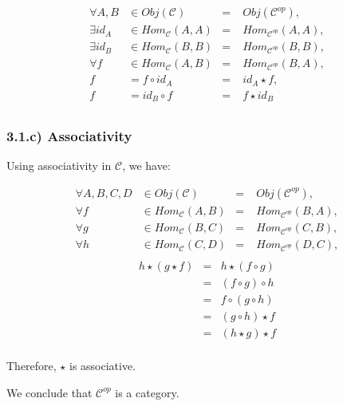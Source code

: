 $$
\begin{aligned}
	\forall A, B & \in Obj (\mathcal{C})        &=& \;  Obj (\mathcal{C}^{op})        , \\
	\exists id_A & \in Hom_{\mathcal{C}} (A, A) &=& \;  Hom_{\mathcal{C}^{op}} (A, A) , \\
	\exists id_B & \in Hom_{\mathcal{C}} (B, B) &=& \;  Hom_{\mathcal{C}^{op}} (B, B) , \\
	\forall f    & \in Hom_{\mathcal{C}} (A, B) &=& \;  Hom_{\mathcal{C}^{op}} (B, A) , \\
	f            & =   f    \circ id_A          &=& \;  id_A \star f                  , \\
	f            & =   id_B \circ    f          &=& \;  f    \star id_B                 \\
\end{aligned}
$$

\subsubsection*{3.1.c) Associativity}

Using associativity in $\mathcal{C}$, we have:

$$
\begin{aligned}
	\forall A, B, C, D & \in Obj (\mathcal{C})        &=& \;  Obj (\mathcal{C}^{op})        , \\
	\forall f          & \in Hom_{\mathcal{C}} (A, B) &=& \;  Hom_{\mathcal{C}^{op}} (B, A) , \\
	\forall g          & \in Hom_{\mathcal{C}} (B, C) &=& \;  Hom_{\mathcal{C}^{op}} (C, B) , \\
	\forall h          & \in Hom_{\mathcal{C}} (C, D) &=& \;  Hom_{\mathcal{C}^{op}} (D, C) , \\
\end{aligned}
$$
$$
\begin{aligned}
	h \star (g \star f) &=&  h \star (f  \circ g) \\
						&=& (f \circ  g) \circ h  \\
						&=&  f \circ  (g \circ h) \\
						&=&  (g \circ h) \star f  \\
						&=&  (h \star g) \star f  \\
\end{aligned}
$$

Therefore, $\star$ is associative.

We conclude that $\mathcal{C}^{op}$ is a category.



